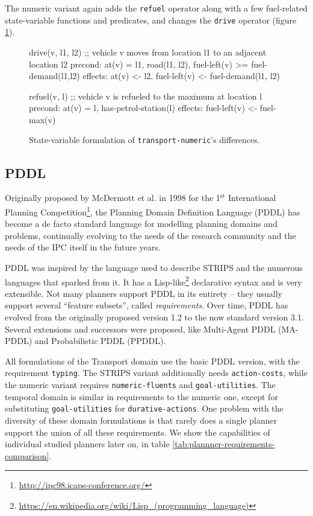 The numeric variant again adds the \verb+refuel+ operator along with
a few fuel-related state-variable functions and predicates, and changes 
the \verb+drive+ operator (figure \ref{code:statevar-numeric}).

\begin{figure}[htb]
\begin{code}
drive(v, l1, l2)
  ;; vehicle v moves from location l1 to an adjacent location l2
  precond: at(v) = l1, road(l1, l2), fuel-left(v) >= fuel-demand(l1,l2)
  effects: at(v) <- l2, fuel-left(v) <-  fuel-demand(l1, l2)
  
refuel(v, l)
  ;; vehicle v is refueled to the maximum at location l
  precond: at(v) = l, has-petrol-station(l)
  effects: fuel-left(v) <- fuel-max(v)
\end{code}
\caption{State-variable formulation of \texttt{transport-numeric}'s differences.}
\label{code:statevar-numeric}
\end{figure}

\subsection{PDDL}\label{pddl}

Originally proposed by McDermott et al. in 1998 for the 1$^{\mathrm{st}}$ International Planning
Competition\footnote{\url{http://ipc98.icaps-conference.org/}},
the Planning Domain Definition Language\cite{McDermott1998} (PDDL) has become
a de facto standard language for modelling planning domains and problems,
continually evolving to the needs of the
research community and the needs of the IPC itself in the future years.

PDDL was inspired by the language used to describe STRIPS\cite{Fikes1971}
and the numerous languages that sparked from it.
It has a Lisp-like\footnote{\url{https://en.wikipedia.org/wiki/Lisp_(programming_language)}}
declarative syntax and is very extensible.
Not many planners support PDDL in its entirety -- they usually support 
several ``feature subsets'', called \textit{requirements}.
Over time, PDDL has evolved from the originally proposed version 1.2
to the now standard version 3.1. Several extensions and successors were proposed,
like Multi-Agent PDDL
(MA-PDDL) and
Probabilistic PDDL
(PPDDL).

All formulations of the Transport domain use the basic PDDL version, with the requirement \verb+typing+.
The STRIPS variant additionally needs \verb+action-costs+, while the numeric variant
requires \verb+numeric-fluents+ and \verb+goal-utilities+.
The temporal domain is similar in requirements to the numeric one, except for
substituting \verb+goal-utilities+ for \verb+durative-actions+.
One problem with the diversity of these domain formulations is that rarely does
a single planner support the union of all these requirements.
We show the capabilities of individual studied planners
later on, in table \ref{tab:plannner-requirements-comparison}.

